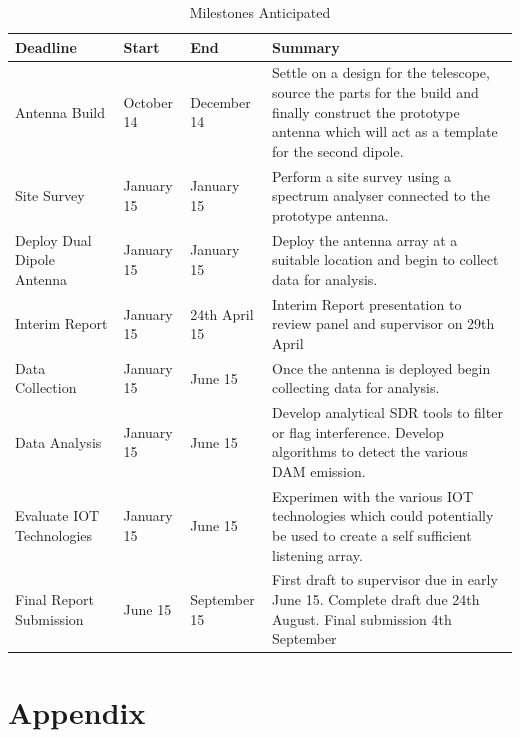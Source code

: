 \documentclass[runningheads,a4paper]{llncs}
\begin{document}
%
\begin{table}
  \centering
  \begin{tabular}{ | p{2cm} | p{2cm} | p{2cm} | p{5cm} |}
    \hline
    Deadline & Start & End & Summary \\ \hline
    Antenna Build & October 14 & December 14 & Settle on a design for the telescope, source the parts for the build
    and finally construct the prototype antenna which will act as a template for the second dipole. \\ \hline
    Site Survey & January 15 & January 15 & Perform a site survey using a spectrum analyser connected to the prototype antenna. \\ \hline
    Deploy Dual Dipole Antenna & January 15 & January 15 & Deploy the antenna array at a suitable location and begin to collect data for analysis. \\ \hline
    Interim Report & January 15 & 24th April 15 & Interim Report presentation to review panel and supervisor on 
    29th April \\ \hline
    Data Collection & January 15 & June 15 & Once the antenna is deployed begin collecting data for analysis. \\ \hline
    Data Analysis & January 15 & June 15 & Develop analytical SDR tools to filter or flag interference. Develop algorithms to detect the various DAM emission. \\ \hline
    Evaluate IOT Technologies & January 15 & June 15 & Experimen with the various IOT technologies which could potentially be used to create a self sufficient listening array. \\ \hline
    Final Report Submission & June 15 & September 15 & First draft to supervisor due in early June 15. Complete draft due 24th August. Final submission 4th September \\
    \hline
  \end{tabular}
  \caption{Milestones Anticipated}
  \label{tab:milestones_anticipated}
\end{table}
%

%
\printglossaries
%


%
\newpage
%
\appendix
\section*{Appendix}
\end{document}
